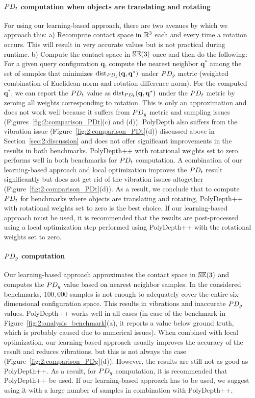 \paragraph{$PD_t$ computation when objects are translating and rotating} For using our learning-based approach, there are two avenues by which we approach this: a) Recompute contact space in $\mathbb R^3$ each and every time a rotation occurs. This will result in very accurate values but is not practical during runtime. b) Compute the contact space in $\mathbb {SE}(3)$ once and then do the following: For a given query configuration $\mathbf q$, compute the nearest neighbor $\mathbf q^*$ among the set of samples that minimizes $\operatorname{dist}_{PD_g}(\mathbf q, \mathbf q^*)$ under $PD_g$ metric (weighted combination of Euclidean norm and rotation difference norm). For the computed $\mathbf q^*$, we can report the $PD_t$ value as $\operatorname{dist}_{PD_t}(\mathbf q, \mathbf q^*)$ under the $PD_t$ metric by zeroing all weights corresponding to rotation. This is only an approximation and does not work well because it suffers from $PD_g$ metric and sampling issues (Figures~\ref{fig:2:comparison_PDt}(c) and (d)). PolyDepth also suffers from the vibration issue (Figure~\ref{fig:2:comparison_PDt}(d)) discussed above in Section~\ref{sec:2:discussion} and does not offer significant improvements in the results in both benchmarks.
PolyDepth++ with rotational weights set to zero performs well in both benchmarks for $PD_t$ computation. A combination of our learning-based approach and local optimization improves the $PD_t$ result significantly but does not get rid of the vibration issues altogether (Figure~\ref{fig:2:comparison_PDt}(d)).
As a result, we conclude that to compute $PD_t$ for benchmarks where objects are translating and rotating, PolyDepth++ with rotational weights set to zero is the best choice. If our learning-based approach must be used, it is recommended that the results are post-processed using a local optimization step performed using PolyDepth++ with the rotational weights set to zero.

\paragraph{$PD_g$ computation} Our learning-based approach approximates the contact space in $\mathbb {SE}(3)$ and computes the $PD_g$ value based on nearest neighbor samples. In the considered benchmarks, $100,000$ samples is not enough to adequately cover the entire six-dimensional configuration space. This results in vibrations and inaccurate $PD_g$ values. PolyDepth++ works well in all cases (in case of the benchmark in Figure~\ref{fig:2:analysis_benchmark}(a), it reports a value below ground truth, which is probably caused due to numerical issues). When combined with local optimization, our learning-based approach usually improves the accuracy of the result and reduces vibrations, but this is not always the case (Figure~\ref{fig:2:comparison_PDg}(d)). However, the results are still not as good as PolyDepth++. As a result, for $PD_g$ computation, it is recommended that PolyDepth++ be used. If our learning-based approach has to be used, we suggest using it with a large number of samples in combination with PolyDepth++. 


